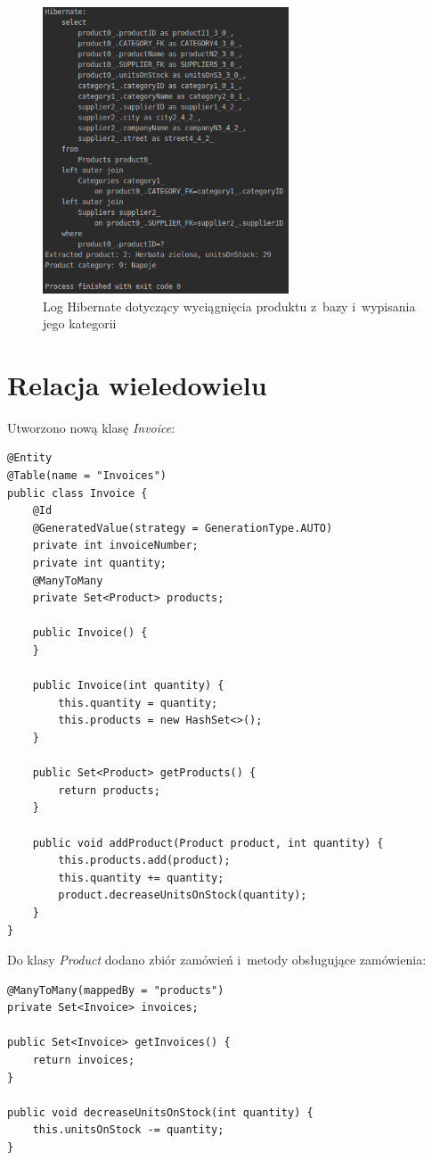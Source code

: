 \documentclass[12pt, a4paper]{mwart}
\begin{document}
\begin{figure}[ht]
  \centering
  \includegraphics[width=0.65\textwidth]{VI/6-7.png}
  \caption{Log Hibernate dotyczący wyciągnięcia produktu z~bazy i~wypisania jego kategorii}
  \label{rys:6.7}
\end{figure}

\clearpage
\section{Relacja wiele\dywiz{}do\dywiz{}wielu}

Utworzono nową klasę \textit{Invoice}:

\begin{lstlisting}
@Entity
@Table(name = "Invoices")
public class Invoice {
    @Id
    @GeneratedValue(strategy = GenerationType.AUTO)
    private int invoiceNumber;
    private int quantity;
    @ManyToMany
    private Set<Product> products;

    public Invoice() {
    }

    public Invoice(int quantity) {
        this.quantity = quantity;
        this.products = new HashSet<>();
    }

    public Set<Product> getProducts() {
        return products;
    }

    public void addProduct(Product product, int quantity) {
        this.products.add(product);
        this.quantity += quantity;
        product.decreaseUnitsOnStock(quantity);
    }
}
\end{lstlisting}

Do klasy \textit{Product} dodano zbiór zamówień i~metody obsługujące zamówienia:
\begin{lstlisting}
@ManyToMany(mappedBy = "products")
private Set<Invoice> invoices;

public Set<Invoice> getInvoices() {
	return invoices;
}

public void decreaseUnitsOnStock(int quantity) {
	this.unitsOnStock -= quantity;
}
\end{lstlisting}
\end{document}
